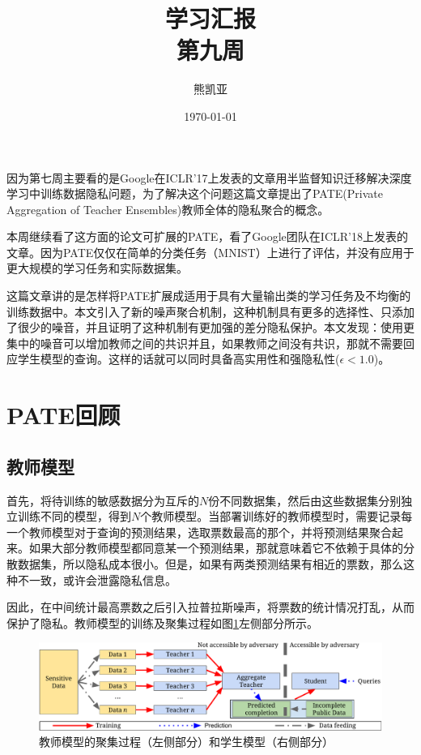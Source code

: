 \documentclass[a4paper]{article}
\title{学习汇报\\第九周}
\author{熊凯亚}
\date{\today}
\begin{document}
\maketitle

因为第七周主要看的是Google在ICLR'17上发表的文章\cite{Papernot2016SemisupervisedKT}用半监督知识迁移解决深度学习中训练数据隐私问题，为了解决这个问题这篇文章提出了PATE(Private Aggregation of Teacher Ensembles)教师全体的隐私聚合的概念。

本周继续看了这方面的论文可扩展的PATE，看了Google团队在ICLR'18上发表的文章\cite{Papernot2018ScalablePL}。因为PATE仅仅在简单的分类任务（MNIST）上进行了评估，并没有应用于更大规模的学习任务和实际数据集。

这篇文章讲的是怎样将PATE扩展成适用于具有大量输出类的学习任务及不均衡的训练数据中。本文引入了新的噪声聚合机制，这种机制具有更多的选择性、只添加了很少的噪音，并且证明了这种机制有更加强的差分隐私保护。本文发现：使用更集中的噪音可以增加教师之间的共识并且，如果教师之间没有共识，那就不需要回应学生模型的查询。这样的话就可以同时具备高实用性和强隐私性($\epsilon<1.0$)。
\section{PATE回顾}
\subsection*{教师模型}

首先，将待训练的敏感数据分为互斥的$N$份不同数据集，然后由这些数据集分别独立训练不同的模型，得到$N$个教师模型。当部署训练好的教师模型时，需要记录每一个教师模型对于查询的预测结果，选取票数最高的那个，并将预测结果聚合起来。如果大部分教师模型都同意某一个预测结果，那就意味着它不依赖于具体的分散数据集，所以隐私成本很小。但是，如果有两类预测结果有相近的票数，那么这种不一致，或许会泄露隐私信息。

因此，在中间统计最高票数之后引入拉普拉斯噪声，将票数的统计情况打乱，从而保护了隐私。教师模型的训练及聚集过程如图\ref*{fig:overview}左侧部分所示。

\begin{figure}[!ht]
\includegraphics[width = \linewidth]{fig/approach-overview.pdf}
\caption{教师模型的聚集过程（左侧部分）和学生模型（右侧部分）}
\label{fig:overview}
\end{figure}
\end{document}
